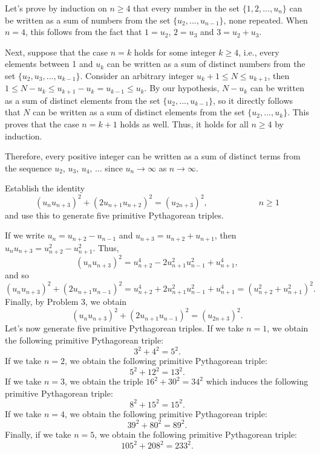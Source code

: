 \begin{solution}
    Let's prove by induction on $n \geq 4$ that every number in the set $\{1, 2, ..., u_n\}$ can be written as a sum of numbers from the set $\{u_2, ..., u_{n-1}\}$, none repeated. When $n = 4$, this follows from the fact that $1 = u_2$, $2 = u_3$ and $3 = u_2 + u_3$.
    
    Next, suppose that the case $n = k$ holds for some integer $k \geq 4$, i.e., every elements between 1 and $u_k$ can be written as a sum of distinct numbers from the set $\{u_2, u_3, ..., u_{k-1}\}$. Consider an arbitrary integer $u_{k} + 1 \leq N \leq u_{k+1}$, then $1 \leq N- u_k \leq u_{k+1} - u_k = u_{k-1} \leq u_k$. By our hypothesis, $N-u_k$ can be written as a sum of distinct elements from the set $\{u_2, ..., u_{k-1}\}$, so it directly follows that $N$ can be written as a sum of distinct elements from the set $\{u_2, ..., u_k\}$. This proves that the case $n = k+1$ holds as well. Thus, it holds for all $n \geq 4$ by induction.
    
    Therefore, every  positive integer can be written as a sum of distinct terms from the sequence $u_2$, $u_3$, $u_4$, ... since $u_n \rightarrow \infty$ as $n \rightarrow \infty$. \\
\end{solution}

\begin{exercise}
    Establish the identity
    $$(u_nu_{n+3})^2 + (2u_{n+1}u_{n+2})^2 = (u_{2n+3})^2, \qquad \qquad \qquad n \geq 1$$
    and use this to generate five primitive Pythagorean triples. \\
\end{exercise}

\begin{solution}
    If we write $u_n = u_{n + 2} - u_{n-1}$ and $u_{n+3} = u_{n+2} + u_{n+1}$, then $u_nu_{n+3} = u_{n+2}^2 - u_{n+1}^2$. Thus,
    $$(u_nu_{n+3})^2 = u_{n+2}^4 - 2u_{n+1}^2u_{n-1}^2 + u_{n+1}^4,$$
    and so
    $$(u_nu_{n+3})^2 + (2u_{n+1}u_{n-1})^2 = u_{n+2}^4 + 2u_{n+1}^2u_{n-1}^2 + u_{n+1}^4 = (u_{n+2}^2 + u_{n+1}^2)^2.$$
    Finally, by Problem 3, we obtain
    $$(u_nu_{n+3})^2 + (2u_{n+1}u_{n-1})^2 = (u_{2n + 3})^2.$$
    Let's now generate five primitive Pythagorean triples. If we take $n = 1$, we obtain the following primitive Pythagorean triple:
    $$3^2 + 4^2 = 5^2.$$
    If we take $n = 2$, we obtain the following primitive Pythagorean triple:
    $$5^2 + 12^2 = 13^2.$$
    If we take $n = 3$, we obtain the triple $16^2 + 30^2 = 34^2$ which induces the following primitive Pythagorean triple:
    $$8^2 + 15^2 = 15^2.$$
    If we take $n = 4$, we obtain the following primitive Pythagorean triple:
    $$39^2 + 80^2 = 89^2.$$
    Finally, if we take $n = 5$, we obtain the following primitive Pythagorean triple:
    $$105^2 + 208^2 = 233^2.$$ \\
\end{solution}

